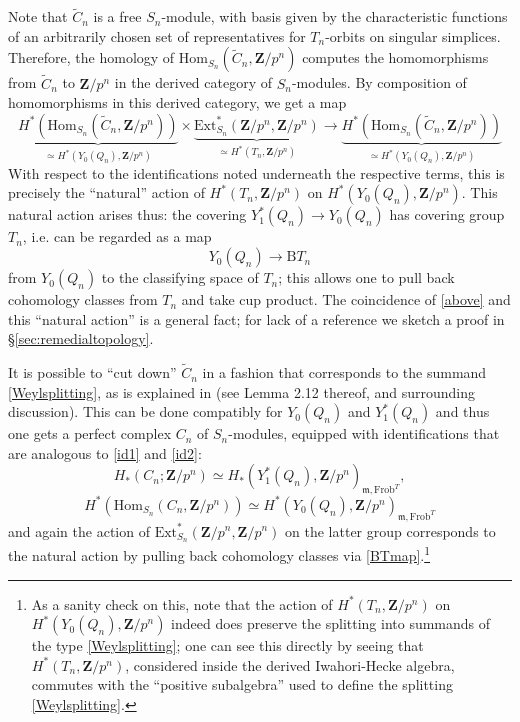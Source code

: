 \documentclass[10pt]{amsart}
\newcommand{\Z}{\mathbf{Z}}
\newcommand{\Ext}{\mathrm{Ext}}
\newcommand{\Hom}{\mathrm{Hom}}
\newcommand{\Frob}{\mathrm{Frob}}
\theoremstyle{remark}
\begin{document}
  Note that $\widetilde{C}_n$ is a free $S_n$-module, with basis given by the characteristic functions of an arbitrarily chosen set of representatives
  for $T_n$-orbits on singular simplices. 
  Therefore, the homology  of $\Hom_{S_n}(\widetilde{C}_n, \Z/p^n)$ computes the homomorphisms from $\widetilde{C}_n$ to $\Z/p^n$
  in the derived category of $S_n$-modules. 
  By composition of homomorphisms in this derived category, we get a map
 \begin{equation} \label{above} \underbrace{H^*  \left( \Hom_{S_n}(\widetilde{C}_n, \Z/p^n) \right) }_{\simeq H^*(Y_0(Q_n),\Z/p^n)} \times  \underbrace{ \Ext^*_{S_n}(\Z/p^n, \Z/p^n) }_{\simeq H^*(T_n,\Z/p^n)} \rightarrow  \underbrace{ H^* \left( \Hom_{S_n}(\widetilde{C}_n, \Z/p^n)\right) }_{\simeq H^*(Y_0(Q_n),\Z/p^n)} \end{equation}
   With respect to the identifications noted underneath the respective terms, this is precisely the ``natural'' action of $H^*(T_n, \Z/p^n)$ on $H^*(Y_0(Q_n), \Z/p^n)$.
  This natural action arises thus: 
   the covering $Y_1^*(Q_n) \rightarrow Y_0(Q_n)$ has covering group $T_n$, i.e. can be regarded as a map
\begin{equation} \label{BTmap} Y_0(Q_n) \rightarrow \mathrm{B}T_n\end{equation} 
   from $Y_0(Q_n)$ to the classifying space of $T_n$; this allows one to pull back cohomology classes from $T_n$ and take cup product. 
      The coincidence of \eqref{above} and this ``natural action'' is a general fact; for lack of a reference we sketch a proof in \S \ref{sec:remedialtopology}. 
 
 
%

It is possible to ``cut down'' $\widetilde{C}_n$ in a fashion that corresponds to  the summand
  \eqref{Weylsplitting}, as is explained in \cite{KT} (see Lemma 2.12 thereof,  and surrounding discussion).  
  This can be done compatibly for $Y_0(Q_n)$ and $Y_1^*(Q_n)$ and thus one gets 
  a perfect complex $C_n$ of $S_n$-modules, equipped with identifications 
that are analogous to \eqref{id1} and \eqref{id2}: 
 \begin{equation} \label{id3} H_*(C_n; \Z/p^n) \simeq H_*(Y_1^*(Q_n), \Z/p^n)_{\mathfrak{m}, \Frob^T}, \end{equation} 
\begin{equation} \label{id4} H^*(\Hom_{S_n}(C_n, \Z/p^n)) \simeq H^*(Y_0(Q_n), \Z/p^n)_{\mathfrak{m}, \Frob^T}\end{equation}
  and again the action of $\Ext^*_{S_n}(\Z/p^n , \Z/p^n)$ on the latter group corresponds to the natural action    by pulling back cohomology classes via \eqref{BTmap}.\footnote{As a sanity check on this, note that the action of $H^*(T_n, \Z/p^n)$ on $H^*(Y_0(Q_n), \Z/p^n)$ indeed
  does preserve the splitting into  summands of the type \eqref{Weylsplitting}; one can see this directly  
  by seeing that $H^*(T_n, \Z/p^n)$, considered inside the  derived Iwahori-Hecke algebra, commutes   with the ``positive subalgebra'' used to define the splitting \eqref{Weylsplitting}.}
%
%
%
%
%
%
%
\end{document}

